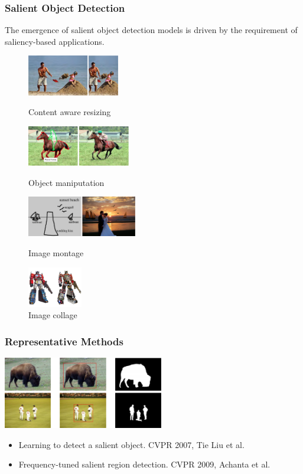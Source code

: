 \documentclass[notheorems,serif,table,compress]{beamer}  %
\begin{document}
\begin{frame}
\frametitle{Salient Object Detection }
The emergence of salient object detection models is driven by the requirement of saliency-based applications.
\begin{figure}[!ht]
  \begin{minipage}[t]{0.4\textwidth}
  \includegraphics[height=0.7in]{resizing}
  \caption{Content aware resizing}
  \end{minipage}
  \begin{minipage}[t]{0.4\textwidth}
  \includegraphics[height=0.7in]{manipulation}
  \caption{Object maniputation}
  \end{minipage}

\hspace{0.28in}
  \begin{minipage}[t]{0.4\textwidth}
  \includegraphics[height=0.7in]{sketch2photo}
  \caption{Image montage}
  \end{minipage}
  \begin{minipage}[t]{0.4\textwidth}
  \hspace{0.35in}
  \includegraphics[height=0.7in]{collage.jpg}
  \caption{Image collage}
  \end{minipage}
\end{figure} 
\end{frame}


\begin{frame}
\frametitle{Representative Methods}
\centering\includegraphics[width=7cm]{FT.png}
\begin{itemize}
\item Learning to detect a salient object. CVPR 2007, Tie Liu et al.
\item Frequency-tuned salient region detection. CVPR 2009, Achanta et al.
\end{itemize}
\end{frame}
\end{document}
